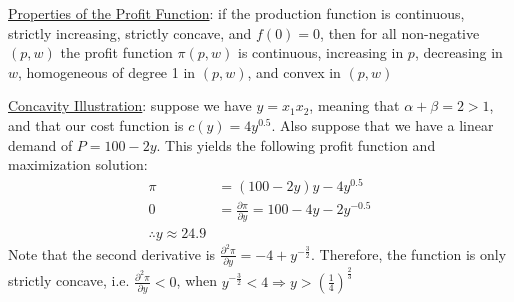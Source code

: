 \documentclass{article}
\begin{document}
  \par
  \underline{Properties of the Profit Function}: if the production function is continuous, strictly increasing, strictly concave, and $f(0) = 0$, then for all non-negative $(p,w)$ the profit function $\pi(p,w)$ is continuous, increasing in $p$, decreasing in $w$, homogeneous of degree 1 in $(p,w)$, and convex in $(p,w)$
  \par
  \underline{Concavity Illustration}: suppose we have $y = x_{1}x_{2}$, meaning that $\alpha + \beta = 2 > 1$, and that our cost function is $c(y) = 4y^{0.5}$. Also suppose that we have a linear demand of $P = 100 - 2y$. This yields the following profit function and maximization solution:
  \begin{align*}
    \pi &= (100 - 2y)y - 4y^{0.5} \\
    0 &= \frac{\partial \pi}{\partial y} = 100 - 4y - 2y^{-0.5} \\
    \therefore y \approx 24.9
  \end{align*}
  Note that the second derivative is $\tfrac{\partial^{2} \pi}{\partial y} = -4 + y^{-\tfrac{3}{2}}$. Therefore, the function is only strictly concave, i.e. $\tfrac{\partial^{2} \pi}{\partial y} < 0$, when $y^{-\tfrac{3}{2}} < 4 \Rightarrow y > (\tfrac{1}{4})^{\tfrac{2}{3}}$
\vspace{6mm}
\end{document}
